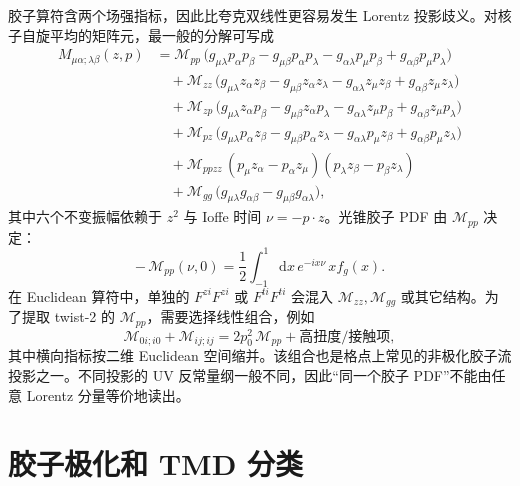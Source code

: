 \documentclass[UTF8,12pt,a4paper,twoside,openany]{ctexbook}
\newcommand{\dd}{\mathrm{d}}
\begin{document}
胶子算符含两个场强指标，因此比夸克双线性更容易发生 Lorentz 投影歧义。对核子自旋平均的矩阵元，最一般的分解可写成
\begin{align}
  M_{\mu\alpha;\lambda\beta}(z,p)
  &=\mathcal M_{pp}\,
  \big(g_{\mu\lambda}p_\alpha p_\beta
  -g_{\mu\beta}p_\alpha p_\lambda
  -g_{\alpha\lambda}p_\mu p_\beta
  +g_{\alpha\beta}p_\mu p_\lambda\big)\nonumber\\
  &\quad+\mathcal M_{zz}\,
  \big(g_{\mu\lambda}z_\alpha z_\beta
  -g_{\mu\beta}z_\alpha z_\lambda
  -g_{\alpha\lambda}z_\mu z_\beta
  +g_{\alpha\beta}z_\mu z_\lambda\big)\nonumber\\
  &\quad+\mathcal M_{zp}\,
  \big(g_{\mu\lambda}z_\alpha p_\beta
  -g_{\mu\beta}z_\alpha p_\lambda
  -g_{\alpha\lambda}z_\mu p_\beta
  +g_{\alpha\beta}z_\mu p_\lambda\big)\nonumber\\
  &\quad+\mathcal M_{pz}\,
  \big(g_{\mu\lambda}p_\alpha z_\beta
  -g_{\mu\beta}p_\alpha z_\lambda
  -g_{\alpha\lambda}p_\mu z_\beta
  +g_{\alpha\beta}p_\mu z_\lambda\big)\nonumber\\
  &\quad+\mathcal M_{ppzz}\,
  (p_\mu z_\alpha-p_\alpha z_\mu)
  (p_\lambda z_\beta-p_\beta z_\lambda)\nonumber\\
  &\quad+\mathcal M_{gg}\,
  \big(g_{\mu\lambda}g_{\alpha\beta}
  -g_{\mu\beta}g_{\alpha\lambda}\big),
  \label{eq:sixamplitudes}
\end{align}
其中六个不变振幅依赖于 \(z^2\) 与 Ioffe 时间 \(\nu=-p\cdot z\)\cite{Balitsky2020}。光锥胶子 PDF 由 \(\mathcal M_{pp}\) 决定：
\begin{equation}
  -\,\mathcal M_{pp}(\nu,0)
  =\frac{1}{2}\int_{-1}^{1}\dd x\,e^{-ix\nu}\,x f_g(x).
  \label{eq:Mpp}
\end{equation}
在 Euclidean 算符中，单独的 \(F^{zi}F^{zi}\) 或 \(F^{ti}F^{ti}\) 会混入 \(\mathcal M_{zz},\mathcal M_{gg}\) 或其它结构。为了提取 twist-2 的 \(\mathcal M_{pp}\)，需要选择线性组合，例如
\begin{equation}
  \mathcal M_{0i;i0}+\mathcal M_{ij;ij}
  =2p_0^2\,\mathcal M_{pp}
  +\text{高扭度/接触项},
  \label{eq:Mppcombination}
\end{equation}
其中横向指标按二维 Euclidean 空间缩并。该组合也是格点上常见的非极化胶子流投影之一\cite{Balitsky2020,FanQuasiGluon2018}。不同投影的 UV 反常量纲一般不同，因此“同一个胶子 PDF”不能由任意 Lorentz 分量等价地读出。

\section{胶子极化和 TMD 分类}
\end{document}
